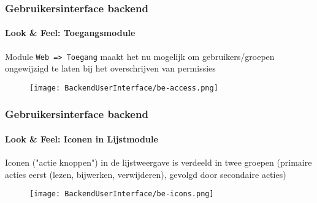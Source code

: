 
\begin{frame}[fragile]
	\frametitle{Gebruikersinterface backend}
	\framesubtitle{Look \& Feel: Toegangsmodule}

	Module \texttt{Web => Toegang} maakt het nu mogelijk om gebruikers/groepen ongewijzigd
	te laten bij het overschrijven van permissies

	\begin{figure}
		\texttt{[image: BackendUserInterface/be-access.png]}
	\end{figure}

\end{frame}


\begin{frame}[fragile]
	\frametitle{Gebruikersinterface backend}
	\framesubtitle{Look \& Feel: Iconen in Lijstmodule}

	Iconen ("actie knoppen") in de lijstweergave is verdeeld in twee groepen\newline
	\smaller (primaire acties eerst (lezen, bijwerken, verwijderen), gevolgd door secondaire acties)

	\begin{figure}
		\texttt{[image: BackendUserInterface/be-icons.png]}
	\end{figure}

\end{frame}

